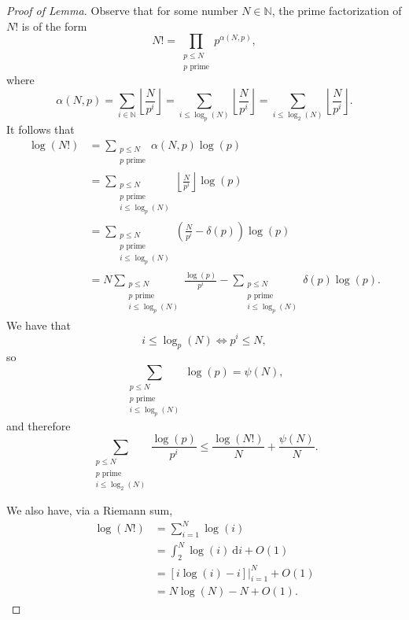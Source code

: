 \documentclass[12pt]{amsart}
\begin{document}
\begin{proof}[Proof of Lemma]
Observe that for some number \(N \in \mathbb{N} \), the prime factorization of \(N!\) is of the form
\[
    N! = \prod _{\substack{ p \leq N \\ p \text{ prime}  }} p ^{\alpha(N,p)}
,\]
where
\[
    \alpha(N,p) = \sum _{i \in \mathbb{N} } \left\lfloor \frac{N}{p ^{i}}  \right\rfloor = \sum _{i \leq \log _{p} \left( N \right) } \left\lfloor \frac{N}{p ^{i}}  \right\rfloor  =\sum _{i \leq \log _{2} \left( N \right) } \left\lfloor \frac{N}{p ^{i}}  \right\rfloor 
.\]
It follows that
\begin{align*}
    \log \left( N! \right) & = \sum _{\substack{ p \leq N \\p \text{ prime}  }} \alpha(N,p) \log \left( p \right) \\
    & = \sum _{\substack{ p \leq N \\p \text{ prime} \\ i \leq \log _{p} \left( N \right)   }} \left\lfloor \frac{N}{p ^{i}}  \right\rfloor \log \left( p \right) \\
    & = \sum _{\substack{ p \leq N \\ p \text{ prime} \\ i \leq \log _{p} \left( N \right)  }} \left( \frac{N}{p ^{i}} - \delta(p) \right) \log \left( p \right) \\
    & = N\sum _{\substack{ p \leq N \\ p \text{ prime} \\ i \leq \log _{p} \left( N \right) }} \frac{\log \left( p \right) }{p ^{i}} - \sum _{\substack{ p \leq N \\ p \text{ prime} \\ i \leq \log _{p} \left( N \right)  }} \delta(p) \log \left( p \right) .
\end{align*}
We have that
\[
    i \leq \log _{p} \left( N \right) \iff p ^{i} \leq N
,\]
so
\[
    \sum  _{\substack{ p \leq N \\ p \text{ prime} \\ i \leq \log _{p} \left( N \right)  }} \log \left( p \right) = \psi(N)
,\]
and therefore
\[
    \sum _{\substack{ p \leq N \\ p \text{ prime} \\ i \leq \log _{2} \left( N \right)  }} \frac{\log \left( p \right) }{p ^{i}} \leq  \frac{\log \left( N! \right) }{N} + \frac{\psi(N)}{N} 
.\]

We also have, via a Riemann sum,
\begin{align*}
    \log \left( N! \right) & = \sum_{i=1}^{N} \log \left( i \right) \\
    & = \int_{2}^{N} \log \left( i \right)  ~\mathrm{d} i + O(1) \\
    & = \left. \left[ i\log \left( i \right) - i \right]  \right|_{i = 1}^{N} + O(1)\\
    & = N \log \left( N \right) - N + O(1).
\end{align*}


\end{proof}
\end{document}
